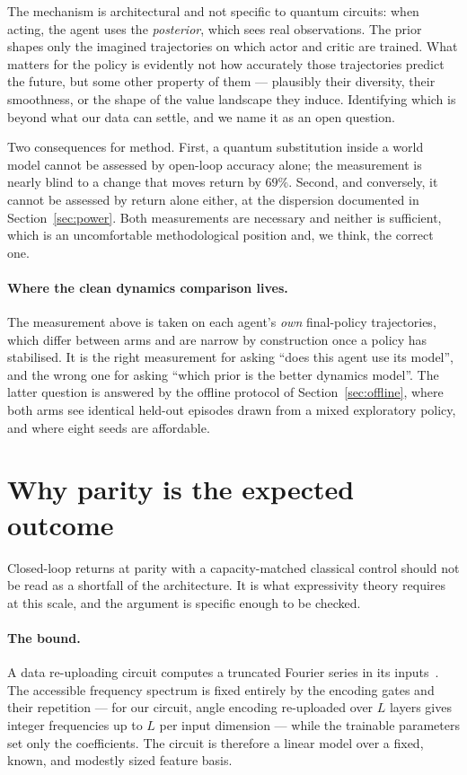\documentclass[11pt,onecolumn]{article}
\begin{document}
The mechanism is architectural and not specific to quantum circuits:
when acting, the agent uses the \emph{posterior}, which sees real
observations. The prior shapes only the imagined trajectories on which
actor and critic are trained. What matters for the policy is evidently
not how accurately those trajectories predict the future, but some
other property of them --- plausibly their diversity, their smoothness,
or the shape of the value landscape they induce. Identifying which is
beyond what our data can settle, and we name it as an open question.

Two consequences for method. First, a quantum substitution inside a
world model cannot be assessed by open-loop accuracy alone; the
measurement is nearly blind to a change that moves return by $69\%$.
Second, and conversely, it cannot be assessed by return alone either,
at the dispersion documented in Section~\ref{sec:power}. Both
measurements are necessary and neither is sufficient, which is an
uncomfortable methodological position and, we think, the correct one.

\paragraph{Where the clean dynamics comparison lives.}
The measurement above is taken on each agent's \emph{own} final-policy
trajectories, which differ between arms and are narrow by construction
once a policy has stabilised. It is the right measurement for asking
``does this agent use its model'', and the wrong one for asking ``which
prior is the better dynamics model''. The latter question is answered
by the offline protocol of Section~\ref{sec:offline}, where both arms
see identical held-out episodes drawn from a mixed exploratory policy,
and where eight seeds are affordable.

\section{Why parity is the expected outcome}\label{sec:parity}
Closed-loop returns at parity with a capacity-matched classical control
should not be read as a shortfall of the architecture. It is what
expressivity theory requires at this scale, and the argument is specific
enough to be checked.

\paragraph{The bound.}
A data re-uploading circuit computes a truncated Fourier series in its
inputs~\cite{schuld2021}. The accessible frequency spectrum is fixed
entirely by the encoding gates and their repetition --- for our circuit,
angle encoding re-uploaded over $L$ layers gives integer frequencies up
to $L$ per input dimension --- while the trainable parameters set only
the coefficients. The circuit is therefore a linear model over a fixed,
known, and modestly sized feature basis.
\end{document}
